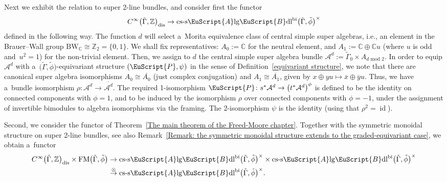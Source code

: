 \documentclass[pdftex]{sigma}
\numberwithin{equation}{section}
\def\mathscr#1{\EuScript{#1}}
\def\Z {\mathbb{Z}}
\def\C {\mathbb{C}}
\def\subset{\subseteq}
\newcommand{\id}{\operatorname{id}}
\newcommand{\LineBdl}{\mathscr{L}\mathscr{B}\mathrm{dl}}
\newcommand{\stwoLineBdltriv}{\mathrm{s}2\LineBdl_{\mathrm{triv}}}
\newcommand{\Alg}{\Incl\mathrm{lg}}
\newcommand{\cssAlg}{\mathrm{cs\text{-}s}\Alg}
\newcommand{\cssAlgBdlbi}{\cssAlg\mathscr{B}\mathrm{dl}^{\mathrm{bi}}}
\newcommand{\Incl}{\mathscr{A}}
\begin{document}
Next we exhibit the relation to super 2-line bundles, and consider first the functor
\begin{equation*}
C^{\infty}\bigl(\tilde \Gamma,\Z\bigr)_{\rm dis} \to\cssAlgBdlbi\bigl(\tilde\Gamma,\tilde\phi\bigr)^{\times}
\end{equation*}
defined in the following way. The function $d$ will select a~Morita equivalence class of central simple super algebras, i.e., an element in the Brauer--Wall group $\mathrm{BW}_{\C}\cong \Z_2=\{0,1\}$. We shall fix representatives: $A_0:=\C$ for the neutral element, and $A_{1}:=\C \oplus \C u$ (where $u$ is odd and~${u^2=1}$) for the non-trivial element. Then, we assign to $d$ the central simple super algebra bundle $\mathcal{A}^{d} := \tilde\Gamma_0 \times A_{d \text{ mod } 2}$.
In order to equip $\mathcal{A}^{d}$ with a~$\bigl(\tilde\Gamma,\tilde\phi\bigr)$-equivariant structure $(\mathscr{P},\psi)$ in the sense of Definition~\ref{equivariant structure}, we note that there are canonical super algebra isomorphisms $A_0 \cong \overline{A_0}$ (just complex conjugation) and $A_1 \cong \overline{A_1}$, given by $x\oplus yu \mapsto \overline{x}\oplus\overline{y}u$. Thus, we have a~bundle isomorphism $\rho\colon \mathcal{A}^{d} \to \overline{\mathcal{A}^{d}}$. The required 1-isomorphism $\mathscr{P}\colon s^*\mathcal{A}^{d} \to \bigl(t^*\mathcal{A}^{d}\bigr)^{\phi}$ is defined to be the identity on connected components with $\phi=1$, and to be induced by the isomorphism $\rho$ over connected components with $\phi=-1$, under the assignment of invertible bimodules to algebra isomorphisms via the framing. The 2-isomorphism $\psi$ is the identity (using that $\rho^2=\id$).

Second, we consider the functor
\smash{$
\mathrm{FM}\bigl(\tilde\Gamma,\tilde\phi\bigr) \to \stwoLineBdltriv^{\text{ref}}\bigl(\tilde\Gamma,\tilde\phi\bigr)
\subset\cssAlgBdlbi\bigl(\tilde\Gamma,\tilde\phi\bigr)^{\times}
$}
of
Theorem~\ref{The main theorem of the Freed-Moore chapter}. Together with the symmetric monoidal structure on super 2-line bundles, see also Remark~\ref{Remark: the symmetric monoidal structure extends to the graded-equivariant case}, we obtain a~functor
\begin{align}
 C^{\infty}\bigl(\tilde \Gamma,\Z\bigr)_{\rm dis} \times \mathrm{FM}\bigl(\tilde\Gamma,\tilde\phi\bigr) &\to \cssAlgBdlbi\bigl(\tilde\Gamma,\tilde\phi\bigr)^{\times}\times \cssAlgBdlbi\bigl(\tilde\Gamma,\tilde\phi\bigr)^{\times}\nonumber \\
 &\stackrel\otimes\to \cssAlgBdlbi\bigl(\tilde\Gamma,\tilde\phi\bigr)^{\times} .\label{DFM-twistings-to-algebra-bundles}
\end{align}
\end{document}
